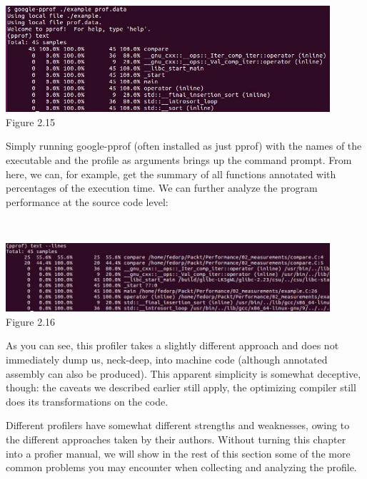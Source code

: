 \hspace*{\fill} \\ %
\begin{center}
\includegraphics[width=0.9\textwidth]{content/1/chapter2/images/15.jpg}\\
Figure 2.15
\end{center}

Simply running google-pprof (often installed as just pprof) with the names of the executable and the profile as arguments brings up the command prompt. From here, we can, for example, get the summary of all functions annotated with percentages of the execution time. We can further analyze the program performance at the source code level:

\hspace*{\fill} \\ %
\begin{center}
\includegraphics[width=0.9\textwidth]{content/1/chapter2/images/16.jpg}\\
Figure 2.16
\end{center}

As you can see, this profiler takes a slightly different approach and does not immediately dump us, neck-deep, into machine code (although annotated assembly can also be produced). This apparent simplicity is somewhat deceptive, though: the caveats we described earlier still apply, the optimizing compiler still does its transformations on the code.

Different profilers have somewhat different strengths and weaknesses, owing to the different approaches taken by their authors. Without turning this chapter into a profier manual, we will show in the rest of this section some of the more common problems you may encounter when collecting and analyzing the profile.

